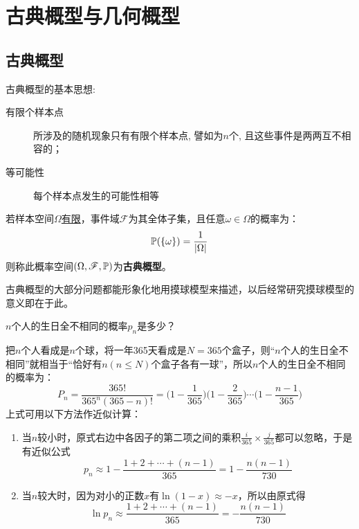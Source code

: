 
\section{古典概型与几何概型}

\subsection{古典概型}

古典概型的基本思想:
\begin{description}
    \item[有限个样本点] 所涉及的随机现象只有有限个样本点, 譬如为$n$个, 且这些事件是两两互不相容的；
    \item[等可能性] 每个样本点发生的可能性相等
\end{description}

\begin{definition}[古典概型]
    若样本空间$\Omega$\underline{有限}，事件域$\mathscr{F}$为其全体子集，且任意$\omega \in \Omega$的概率为：
    \[ \P(\{ \omega \} ) = \frac1{\abs{\Omega}} \]
    则称此概率空间$(\Omega,\mathscr{F},\P)$为\textbf{古典概型}。
\end{definition}
\begin{note}
    古典概型的大部分问题都能形象化地用摸球模型来描述，以后经常研究摸球模型的意义即在于此。
\end{note}

\begin{example}[生日问题]
   $n$个人的生日全不相同的概率$p_n$是多少？
\end{example}
\begin{solution}
    把$n$个人看成是$n$个球，将一年365天看成是$N=365$个盒子，则“$n$个人的生日全不相同”就相当于“恰好有$n (n \le N)$个盒子各有一球”，所以$n$个人的生日全不相同的概率为：
    \[ P_n = \frac{365!}{365^n (365 - n)!} = \biggl(1 - \frac1{365}\biggr) \biggl(1 - \frac{2}{365}\biggr) \dotsb \biggl(1 - \frac{n - 1}{365}\biggr) \]
    上式可用以下方法作近似计算：
    \begin{enumerate}
        \item 当$n$较小时，原式右边中各因子的第二项之间的乘积$\frac{i}{365} \times \frac{j}{365}$都可以忽略，于是有近似公式
              \[ p_n \approx 1 - \frac{1 + 2 + \dotsb + (n - 1)}{365}  = 1 - \frac{n (n - 1)}{730}\]
        \item 当$n$较大时，因为对小的正数$x$有$\ln (1-x) \approx -x$，所以由原式得
              \[ \ln p_n \approx \frac{1 + 2 + \dotsb + (n - 1)}{365} = -\frac{n (n - 1)}{730}\]
    \end{enumerate}
\end{solution}

